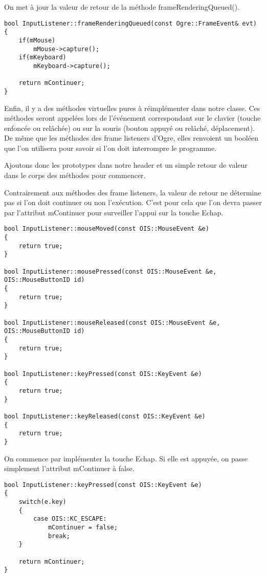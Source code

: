 On met à jour la valeur de retour de la méthode frameRenderingQueued().

\begin{lstlisting}[caption={}]
bool InputListener::frameRenderingQueued(const Ogre::FrameEvent& evt)
{
    if(mMouse)
        mMouse->capture();
    if(mKeyboard)
        mKeyboard->capture();

    return mContinuer;
}
\end{lstlisting}

Enfin, il y a des méthodes virtuelles pures à réimplémenter dans notre classe. Ces méthodes seront appelées lors de l'événement correspondant sur le clavier (touche enfoncée ou rel\^achée) ou sur la souris (bouton appuyé ou rel\^aché, déplacement). De même que les méthodes des frame listeners d'Ogre, elles renvoient un booléen que l'on utilisera pour savoir si l'on doit interrompre le programme.

Ajoutons donc les prototypes dans notre header et un simple retour de valeur dans le corps des méthodes pour commencer.

Contrairement aux méthodes des frame listeners, la valeur de retour ne détermine pas si l'on doit continuer ou non l'exécution. C'est pour cela que l'on devra passer par l'attribut mContinuer pour surveiller l'appui sur la touche Echap.


\begin{lstlisting}[caption={Méthodes virtuelles appelées lors d'un évènement sur un périphérique}]
bool InputListener::mouseMoved(const OIS::MouseEvent &e)
{
    return true;
}

bool InputListener::mousePressed(const OIS::MouseEvent &e, OIS::MouseButtonID id)
{
    return true;
}

bool InputListener::mouseReleased(const OIS::MouseEvent &e, OIS::MouseButtonID id)
{
    return true;
}

bool InputListener::keyPressed(const OIS::KeyEvent &e)
{
    return true;
}

bool InputListener::keyReleased(const OIS::KeyEvent &e)
{
    return true;
}
\end{lstlisting}

On commence par implémenter la touche Echap. Si elle est appuyée, on passe simplement l'attribut mContinuer à false.

\begin{lstlisting}[caption={Implémentation de l'appuie sur ECHAP}]
bool InputListener::keyPressed(const OIS::KeyEvent &e)
{
    switch(e.key)
    {
        case OIS::KC_ESCAPE:
            mContinuer = false;
            break;
    }

    return mContinuer;
}
\end{lstlisting}

